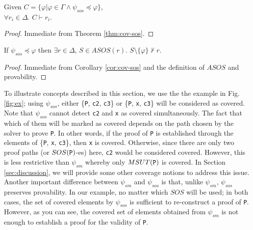 \begin{coroll}
\label{cor:cov-sos}
Given $C = \{\varphi | \varphi \in \Gamma \wedge  \psi_{sos} \preccurlyeq \varphi \}$, \\
$\forall r_i \in \Delta$. $C \vdash r_i$.
\end{coroll}
\begin{proof}
Immediate from Theorem \ref{thm:cov-sos}.
\end{proof}
\vspace{2mm}

\begin{theorem}
\label{thm:sos-r}
If $\psi_{sos} \preccurlyeq \varphi$ then $\exists r \in \Delta$, $S \in ASOS(r)$.
$S \setminus \{\varphi \} \nvdash r$.
\end{theorem}
\begin{proof}
Immediate from Corollary \ref{cor:cov-sos} and the definition of $ASOS$ and provability.
\end{proof}
\vspace{2mm}
To illustrate concepts described in this section, we use the the example in Fig. \ref{fig:ex};
using $\psi_{sos}$, either \{{\tt P}, {\tt c2}, {\tt c3}\} or
 \{{\tt P}, {\tt x}, {\tt c3}\} will be considered as covered. Note that
 $\psi_{sos}$ cannot detect {\tt c2} and {\tt x} as covered simultaneously.
 The fact that which of them will be marked as covered depends on
 the path chosen by the solver to prove {\tt P}. In other words,
 if the proof of {\tt P} is established through the elements of \{{\tt P}, {\tt x}, {\tt c3}\},
 then {\tt x} is covered. Otherwise, since there are only two proof paths (or $SOS({\tt P})$-es)
 here, {\tt c2} would be considered covered. However, this is less restrictive than $\psi_{sm}$ whereby only $MSUT({\tt P})$ is covered. In Section \ref{sec:discussion}, we will provide some other coverage notions to address this issue.
 Another important difference between $\psi_{sm}$ and $\psi_{sos}$ is that, unlike $\psi_{sm}$,
 $\psi_{sos}$ preserves provability. In our example, no matter which $SOS$ will be used;
 in both cases, the set of covered elements by $\psi_{sos}$ is sufficient to re-construct a proof of {\tt P}.
 However, as you can see, the covered set of elements obtained from $\psi_{sm}$ is not
 enough to establish a proof for the validity of {\tt P}.
